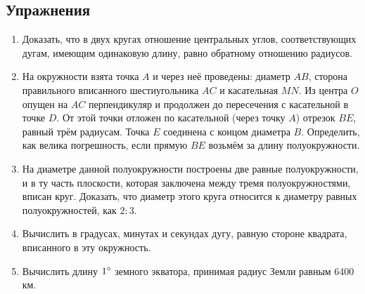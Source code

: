 {\small

\subsection*{Упражнения}

\begin{enumerate}[noitemsep]

\item
Доказать, что в двух кругах отношение центральных углов, соответствующих дугам, имеющим одинаковую длину, равно обратному отношению радиусов.

\item
На окружности взята точка $A$ и через неё проведены:
диаметр $AB$, сторона правильного вписанного шестиугольника $AC$ и касательная $MN$.
Из центра $O$ опущен на $AC$ перпендикуляр и продолжен до пересечения с касательной в точке $D$.
От этой точки отложен по касательной (через точку $A$) отрезок $BE$, равный трём радиусам.
Точка $E$ соединена с концом диаметра $B$.
Определить, как велика погрешность, если прямую $BE$ возьмём за длину полуокружности.

\item
На диаметре данной полуокружности построены две равные полуокружности, и в ту часть плоскости, которая заключена между тремя полуокружностями, вписан круг.
Доказать, что диаметр этого круга относится к диаметру равных полуокружностей, как $2:3$.

\item
Вычислить в градусах, минутах и секундах дугу, равную стороне квадрата, вписанного в эту окружность.

\item
Вычислить длину $1\degree$ земного экватора, принимая радиус Земли равным 6400 км.

\end{enumerate}

}
